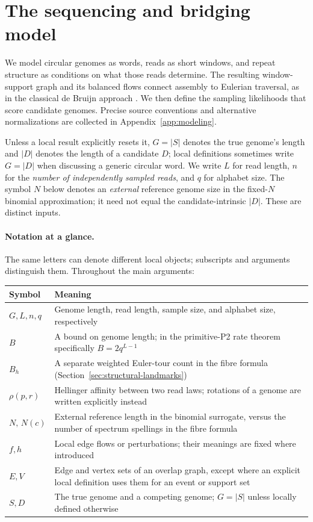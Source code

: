 \section{The sequencing and bridging model}
\label{sec:model}

We model circular genomes as words, reads as short windows, and repeat
structure as conditions on what those reads determine. The resulting
window-support graph and its balanced flows connect assembly to Eulerian
traversal, as in the classical de Bruijn approach
\parencite{idury1995,pevzner2001}. We then define the sampling likelihoods
that score candidate genomes. Precise source conventions and alternative
normalizations are collected in Appendix~\ref{app:modeling}.

Unless a local result explicitly resets it, $G=|S|$ denotes
the true genome's length and $|D|$ denotes the length of a
candidate $D$; local definitions sometimes write $G=|D|$
when discussing a generic circular word. We write $L$ for
read length, $n$ for the \emph{number of independently sampled reads},
and $q$ for alphabet size. The symbol $N$ below denotes
an \emph{external} reference genome size in the fixed-$N$
binomial approximation; it need not equal the candidate-intrinsic
$|D|$. These are distinct inputs.

\paragraph{Notation at a glance.}
The same letters can denote different local objects; subscripts and
arguments distinguish them. Throughout the main arguments:
\begin{center}
\small
\begin{tabular}{@{}p{}p{}@{}}
\toprule
Symbol & Meaning \\
\midrule
$G,L,n,q$ & Genome length, read length, sample size, and alphabet size, respectively \\
$B$ & A bound on genome length; in the primitive-P2 rate theorem specifically $B=2q^{L-1}$ \\
$B_h$ & A separate weighted Euler-tour count in the fibre formula (Section~\ref{sec:structural-landmarks}) \\
$\rho(p,r)$ & Hellinger affinity between two read laws; rotations of a genome are written explicitly instead \\
$N,\,N(c)$ & External reference length in the binomial surrogate, versus the number of spectrum spellings in the fibre formula \\
$f,h$ & Local edge flows or perturbations; their meanings are fixed where introduced \\
$E,V$ & Edge and vertex sets of an overlap graph, except where an explicit local definition uses them for an event or support set \\
$S,D$ & The true genome and a competing genome; $G=|S|$ unless locally defined otherwise \\
\bottomrule
\end{tabular}
\end{center}


